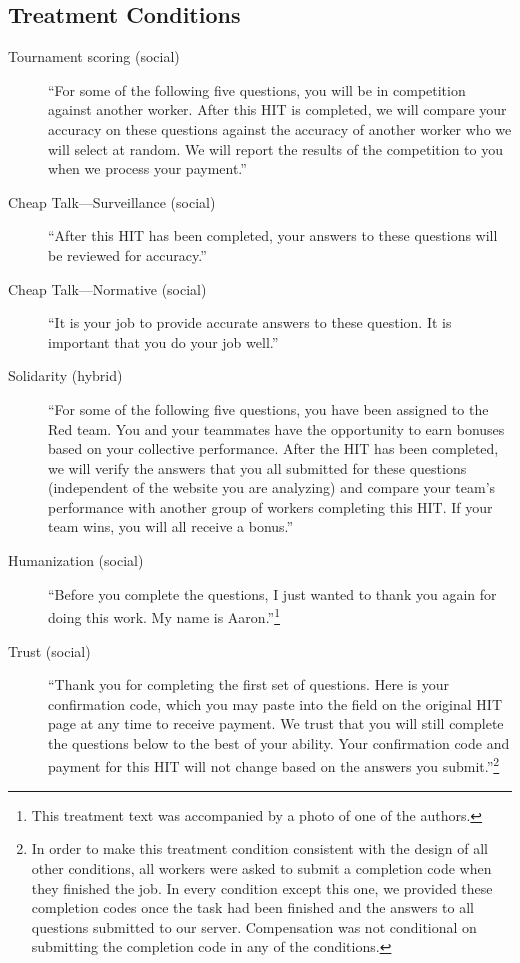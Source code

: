 \documentclass{chi2009}
\begin{document}
\subsection{Treatment Conditions}

\begin{description}
\item[Tournament scoring (social)] ``For some of the following five questions, you will be in competition against another worker. After this HIT is completed, we will compare your accuracy on these questions against the accuracy of another worker who we will select at random. We will report the results of the competition to you when we process your payment.''%

\item[Cheap Talk---Surveillance (social)] ``After this HIT has been
  completed, your answers to these questions will be reviewed for
  accuracy.'' %
\item[Cheap Talk---Normative (social)] ``It is your job to provide
  accurate answers to these question. It is important that you do your
  job well.'' %
\item[Solidarity (hybrid)] ``For some of the following five questions,
  you have been assigned to the Red team. You and your teammates have
  the opportunity to earn bonuses based on your collective
  performance. After the HIT has been completed, we will verify the
  answers that you all submitted for these questions (independent of
  the website you are analyzing) and compare your team's performance
  with another group of workers completing this HIT. If your team
  wins, you will all receive a bonus.'' %
\item[Humanization (social)] ``Before you complete the questions, I
  just wanted to thank you again for doing this work. My name is
  Aaron.''\footnote{This treatment text was accompanied by a photo of one of the authors.} %
\item[Trust (social)] ``Thank you for completing the first set of
  questions. Here is your confirmation code, which you may paste into
  the field on the original HIT page at any time to receive
  payment. We trust that you will still complete the questions below
  to the best of your ability. Your confirmation code and payment for
  this HIT will not change based on the answers you
  submit.''\footnote{In order to make this treatment condition consistent with the design of all other conditions, all workers were asked to submit a completion code when they finished the job. In every condition except this one, we provided these completion codes once the task had been finished and the answers to all questions submitted to our server. Compensation was not conditional on submitting the completion code in any of the conditions.} %

\end{description}
\end{document}
